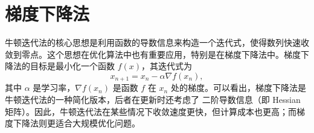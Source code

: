 \section{梯度下降法}
牛顿迭代法的核心思想是利用函数的导数信息来构造一个迭代式，使得数列快速收敛到零点。这个思想在优化算法中也有重要应用，特别是在梯度下降法中。梯度下降法的目标是最小化一个函数 $f(x)$，其迭代式为
\[x_{n+1} = x_n - \alpha \nabla f(x_n),
\]其中 $\alpha$ 是学习率，$\nabla f(x_n)$ 是函数 $f$ 在 $x_n$ 处的梯度。可以看出，梯度下降法是牛顿迭代法的一种简化版本，后者在更新时还考虑了    二阶导数信息（即 Hessian 矩阵）。因此，牛顿迭代法在某些情况下收敛速度更快，但计算成本也更高；而梯度下降法则更适合大规模优化问题。   

